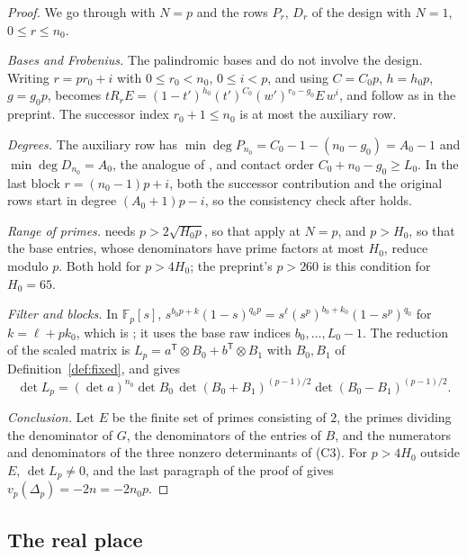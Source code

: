 \documentclass[11pt]{article}
\theoremstyle{definition}
\begin{document}
\begin{proof}
We go through \cite[Sec.~4]{OAI} with $N=p$ and the rows $P_r$, $D_r$ of the design with $N=1$, $0\le r\le n_0$.

\emph{Bases and Frobenius.} The palindromic bases and \cite[Eqs.~(49)--(51)]{OAI} do not involve the design. Writing $r=pr_0+i$ with $0\le r_0<n_0$, $0\le i<p$, and using $C=C_0p$, $h=h_0p$, $g=g_0p$, \cite[Eq.~(52)]{OAI} becomes $tR_rE=(1-t')^{h_0}(t')^{C_0}(w')^{r_0-g_0}E\,w^i$, and \cite[Eqs.~(53)--(55)]{OAI} follow as in the preprint. The successor index $r_0+1\le n_0$ is at most the auxiliary row.

\emph{Degrees.} The auxiliary row has $\min\deg P_{n_0}=C_0-1-(n_0-g_0)=A_0-1$ and $\min\deg D_{n_0}=A_0$, the analogue of \cite[Eq.~(56)]{OAI}, and contact order $C_0+n_0-g_0\ge L_0$. In the last block $r=(n_0-1)p+i$, both the successor contribution and the original rows start in degree $(A_0+1)p-i$, so the consistency check after \cite[Eq.~(56)]{OAI} holds.

\emph{Range of primes.} \cite[Sec.~4.3]{OAI} needs $p>2\sqrt{H_0p}$, so that \cite[Eqs.~(31), (36)]{OAI} apply at $N=p$, and $p>H_0$, so that the base entries, whose denominators have prime factors at most $H_0$, reduce modulo $p$. Both hold for $p>4H_0$; the preprint's $p>260$ is this condition for $H_0=65$.

\emph{Filter and blocks.} In $\mathbb F_p[s]$, $s^{b_0p+k}(1-s)^{q_0p}=s^\ell(s^p)^{b_0+k_0}(1-s^p)^{q_0}$ for $k=\ell+pk_0$, which is \cite[Eq.~(58)]{OAI}; it uses the base raw indices $b_0,\dots,L_0-1$. The reduction of the scaled matrix is $L_p=a^{\mathsf T}\otimes B_0+b^{\mathsf T}\otimes B_1$ with $B_0,B_1$ of Definition~\ref{def:fixed}, and \cite[Eq.~(60)]{OAI} gives
\[
\det L_p=(\det a)^{n_0}\det B_0\,\det(B_0+B_1)^{(p-1)/2}\det(B_0-B_1)^{(p-1)/2}.
\]

\emph{Conclusion.} Let $E$ be the finite set of primes consisting of $2$, the primes dividing the denominator of $G$, the denominators of the entries of $B$, and the numerators and denominators of the three nonzero determinants of (C3). For $p>4H_0$ outside $E$, $\det L_p\ne0$, and the last paragraph of the proof of \cite[Prop.~4.1]{OAI} gives $v_p(\Delta_p)=-2n=-2n_0p$.
\end{proof}

\subsection{The real place}\label{sec:real}
\end{document}
